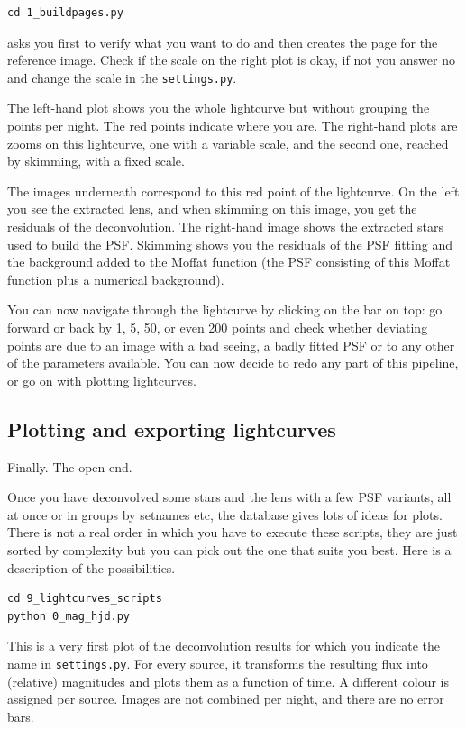\begin{Verbatim}
cd 1_buildpages.py
\end{Verbatim}
asks you first to verify what you want to do and then creates the page for the reference image. Check if the scale on the right plot is okay, if not you answer no and change the scale in the \verb+settings.py+. 

The left-hand plot shows you the whole lightcurve but without grouping the points per night. The red points indicate where you are. The right-hand plots are zooms on this lightcurve, one with a variable scale, and the second one, reached by skimming, with a fixed scale.

The images underneath correspond to this red point of the lightcurve. On the left you see the extracted lens, and when skimming on this image, you get the residuals of the deconvolution. The right-hand image shows the extracted stars used to build the PSF. Skimming shows you the residuals of the PSF fitting and the background added to the Moffat function (the PSF consisting of this Moffat function plus a numerical background).

You can now navigate through the lightcurve by clicking on the bar on top: go forward or back by 1, 5, 50, or even 200 points and check whether deviating points are due to an image with a bad seeing, a badly fitted PSF or to any other of the parameters available. You can now decide to redo any part of this pipeline, or go on with plotting lightcurves. 

\subsection{Plotting and exporting lightcurves}

Finally. The open end.

Once you have deconvolved some stars and the lens with a few PSF variants, all at once or in groups by setnames etc, the database gives lots of ideas for plots. There is not a real order in which you have to execute these scripts, they are just sorted by complexity but you can pick out the one that suits you best. Here is a description of the  possibilities.

\begin{Verbatim}
cd 9_lightcurves_scripts
python 0_mag_hjd.py
\end{Verbatim}

This is a very first plot of the deconvolution results for which you indicate the name in \verb+settings.py+. For every source, it transforms the resulting flux into (relative) magnitudes and plots them as a function of time. A different colour is assigned per source. Images are not combined per night, and there are no error bars.

